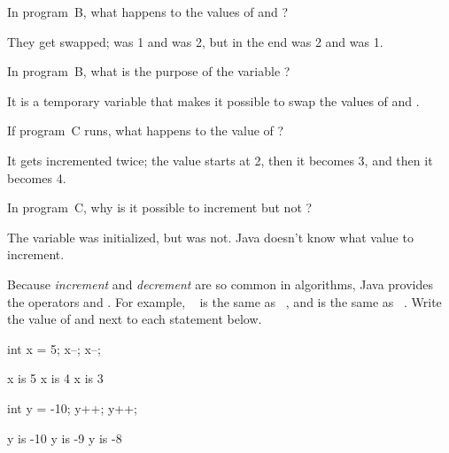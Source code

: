 \Q In program~\textsf{B}, what happens to the values of  and ?

\begin{answer}[3em]
They get swapped;  was 1 and  was 2, but in the end  was 2 and  was 1.
\end{answer}


\Q In program~\textsf{B}, what is the purpose of the variable ?

\begin{answer}[3em]
It is a temporary variable that makes it possible to swap the values of  and .
\end{answer}


\Q If program~\textsf{C} runs, what happens to the value of ?

\begin{answer}[3em]
It gets incremented twice; the value starts at 2, then it becomes 3, and then it becomes 4.
\end{answer}


\Q In program~\textsf{C}, why is it possible to increment  but not ?

\begin{answer}[3em]
The variable  was initialized, but  was not.
Java doesn't know what value to increment.
\end{answer}


\Q Because \emph{increment} and \emph{decrement} are so common in algorithms, Java provides the operators \java{++} and \java{--}.
For example, ~ is the same as ~, and  is the same as ~.
Write the value of  and  next to each statement below.

\vspace{-1ex}
\begin{center}
\begin{minipage}{90pt}
\begin{javalst}
int x = 5;
x--;
x--;
\end{javalst}
\end{minipage}
\begin{minipage}{100pt}
\begin{answer}[3.5em]
\begin{javaans}
x is 5
x is 4
x is 3
\end{javaans}
\end{answer}
\end{minipage}
\hspace{3em}
\begin{minipage}{90pt}
\begin{javalst}
int y = -10;
y++;
y++;
\end{javalst}
\end{minipage}
\begin{minipage}{100pt}
\begin{answer}[3.5em]
\begin{javaans}
y is -10
y is -9
y is -8
\end{javaans}
\end{answer}
\end{minipage}
\end{center}
\vspace{-1em}


